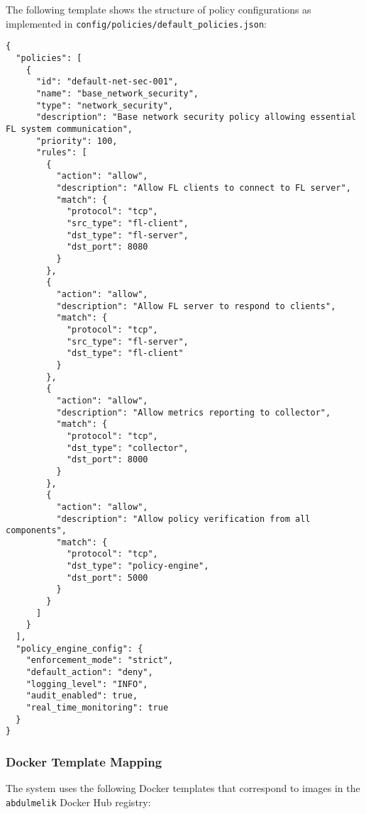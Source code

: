 The following template shows the structure of policy configurations as implemented in \texttt{config/policies/default\_policies.json}:

\begin{lstlisting}[style=jsoncode, caption=Policy Configuration Template]
{
  "policies": [
    {
      "id": "default-net-sec-001",
      "name": "base_network_security",
      "type": "network_security",
      "description": "Base network security policy allowing essential FL system communication",
      "priority": 100,
      "rules": [
        {
          "action": "allow",
          "description": "Allow FL clients to connect to FL server",
          "match": {
            "protocol": "tcp",
            "src_type": "fl-client",
            "dst_type": "fl-server",
            "dst_port": 8080
          }
        },
        {
          "action": "allow",
          "description": "Allow FL server to respond to clients",
          "match": {
            "protocol": "tcp",
            "src_type": "fl-server",
            "dst_type": "fl-client"
          }
        },
        {
          "action": "allow",
          "description": "Allow metrics reporting to collector",
          "match": {
            "protocol": "tcp",
            "dst_type": "collector",
            "dst_port": 8000
          }
        },
        {
          "action": "allow",
          "description": "Allow policy verification from all components",
          "match": {
            "protocol": "tcp",
            "dst_type": "policy-engine",
            "dst_port": 5000
          }
        }
      ]
    }
  ],
  "policy_engine_config": {
    "enforcement_mode": "strict",
    "default_action": "deny",
    "logging_level": "INFO",
    "audit_enabled": true,
    "real_time_monitoring": true
  }
}
\end{lstlisting}

\subsubsection{Docker Template Mapping}

The system uses the following Docker templates that correspond to images in the \texttt{abdulmelik} Docker Hub registry:

